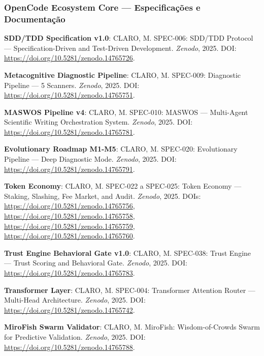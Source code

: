 \subsubsection{OpenCode Ecosystem Core — Especificações e Documentação}

\begin{enumerate}[leftmargin=*, label={[R\arabic*]}, resume]
  \item \textbf{SDD/TDD Specification v1.0}: CLARO, M. SPEC-006: SDD/TDD Protocol — Specification-Driven and Test-Driven Development. \textit{Zenodo}, 2025. DOI: \url{https://doi.org/10.5281/zenodo.14765726}.
  
  \item \textbf{Metacognitive Diagnostic Pipeline}: CLARO, M. SPEC-009: Diagnostic Pipeline — 5 Scanners. \textit{Zenodo}, 2025. DOI: \url{https://doi.org/10.5281/zenodo.14765751}.
  
  \item \textbf{MASWOS Pipeline v4}: CLARO, M. SPEC-010: MASWOS — Multi-Agent Scientific Writing Orchestration System. \textit{Zenodo}, 2025. DOI: \url{https://doi.org/10.5281/zenodo.14765781}.
  
  \item \textbf{Evolutionary Roadmap M1-M5}: CLARO, M. SPEC-020: Evolutionary Pipeline — Deep Diagnostic Mode. \textit{Zenodo}, 2025. DOI: \url{https://doi.org/10.5281/zenodo.14765791}.
  
  \item \textbf{Token Economy}: CLARO, M. SPEC-022 a SPEC-025: Token Economy — Staking, Slashing, Fee Market, and Audit. \textit{Zenodo}, 2025. DOIs: \url{https://doi.org/10.5281/zenodo.14765756}, \url{https://doi.org/10.5281/zenodo.14765758}, \url{https://doi.org/10.5281/zenodo.14765759}, \url{https://doi.org/10.5281/zenodo.14765760}.
  
  \item \textbf{Trust Engine Behavioral Gate v1.0}: CLARO, M. SPEC-038: Trust Engine — Trust Scoring and Behavioral Gate. \textit{Zenodo}, 2025. DOI: \url{https://doi.org/10.5281/zenodo.14765783}.
  
  \item \textbf{Transformer Layer}: CLARO, M. SPEC-004: Transformer Attention Router — Multi-Head Architecture. \textit{Zenodo}, 2025. DOI: \url{https://doi.org/10.5281/zenodo.14765742}.
  
  \item \textbf{MiroFish Swarm Validator}: CLARO, M. MiroFish: Wisdom-of-Crowds Swarm for Predictive Validation. \textit{Zenodo}, 2025. DOI: \url{https://doi.org/10.5281/zenodo.14765788}.
  

\end{enumerate}
